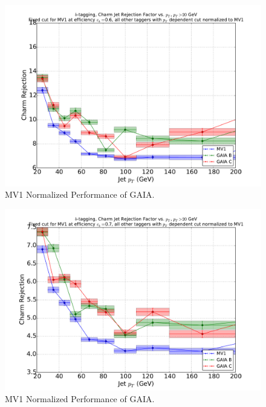 \begin{figure}
\includegraphics[width=\textwidth]{figures/btag/c_rej_mv1normalized_pTdep_60pct.pdf}
\caption[The ATLAS detector]{MV1 Normalized Performance of GAIA.
\label{fig:crejmv1norm60}}
\end{figure}

\begin{figure}
\includegraphics[width=\textwidth]{figures/btag/c_rej_mv1normalized_pTdep_70pct.pdf}
\caption[The ATLAS detector]{MV1 Normalized Performance of GAIA.
\label{fig:crejmv1norm60}}
\end{figure}


